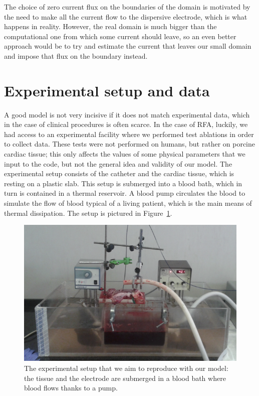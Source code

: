 The choice of zero current flux on the boundaries of the domain is motivated by the need to make all the current flow to the dispersive electrode, which is what happens in reality.
However, the real domain is much bigger than the computational one from which some current should leave, so an even better approach would be to try and estimate the current that leaves our small domain and impose that flux on the boundary instead.

\section{Experimental setup and data}
\label{sec_experiment}
A good model is not very incisive if it does not match experimental data, which in the case of clinical procedures is often scarce.
In the case of RFA, luckily, we had access to an experimental facility where we performed test ablations in order to collect data.
These tests were not performed on humans, but rather on porcine cardiac tissue; this only affects the values of some physical parameters that we input to the code, but not the general idea and validity of our model.
The experimental setup consists of the catheter and the cardiac tissue, which is resting on a plastic slab.
This setup is submerged into a blood bath, which in turn is contained in a thermal reservoir.
A blood pump circulates the blood to simulate the flow of blood typical of a living patient, which is the main means of thermal dissipation.
The setup is pictured in Figure~\ref{fig_rfa_experiment}.
\begin{figure}
  \centering
    \includegraphics[width=\columnwidth]{img/rfa/experiment}
    \caption{The experimental setup that we aim to reproduce with our model: the tissue and the electrode are submerged in a blood bath where blood flows thanks to a pump.}
    \label{fig_rfa_experiment}
\end{figure}

